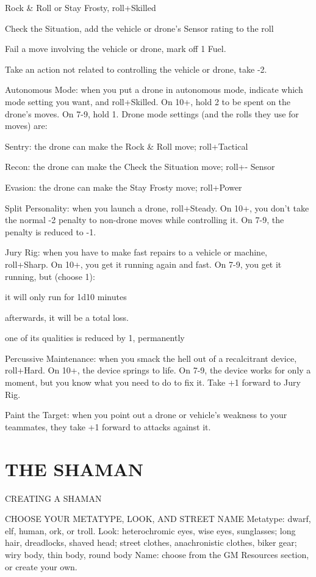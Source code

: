 Rock \& Roll or Stay Frosty, roll+Skilled

Check the Situation, add the vehicle or drone’s Sensor rating to the roll

Fail a move involving the vehicle or drone, mark off 1 Fuel.

Take an action not related to controlling the vehicle or drone, take -2.

Autonomous Mode: when you put a drone in autonomous mode, indicate which mode setting you want, and roll+Skilled. On 10+, hold 2 to be spent on the drone’s moves. On 7-9, hold 1. Drone mode settings (and the rolls they use for moves) are:

Sentry: the drone can make the Rock \& Roll move; roll+Tactical

Recon: the drone can make the Check the Situation move; roll+- Sensor

Evasion: the drone can make the Stay Frosty move; roll+Power

Split Personality: when you launch a drone, roll+Steady. On 10+, you don’t take the normal -2 penalty to non-drone moves while controlling it. On 7-9, the penalty is reduced to -1.

Jury Rig: when you have to make fast repairs to a vehicle or machine, roll+Sharp. On 10+, you get it running again and fast. On 7-9, you get it running, but (choose 1):

it will only run for 1d10 minutes

afterwards, it will be a total loss.

one of its qualities is reduced by 1, permanently

Percussive Maintenance: when you smack the hell out of a recalcitrant device, roll+Hard. On 10+, the device springs to life. On 7-9, the device works for only a moment, but you know what you need to do to fix it. Take +1 forward to Jury Rig.

Paint the Target: when you point out a drone or vehicle’s weakness to your teammates, they take +1 forward to attacks against it.



\clearpage
\section{THE SHAMAN}
CREATING A SHAMAN

CHOOSE YOUR METATYPE, LOOK, AND STREET NAME
Metatype: dwarf, elf, human, ork, or troll.
Look: heterochromic eyes, wise eyes, sunglasses; long hair, dreadlocks, shaved head; street clothes, anachronistic clothes, biker gear; wiry body, thin body, round body
Name: choose from the GM Resources section, or create your own.

